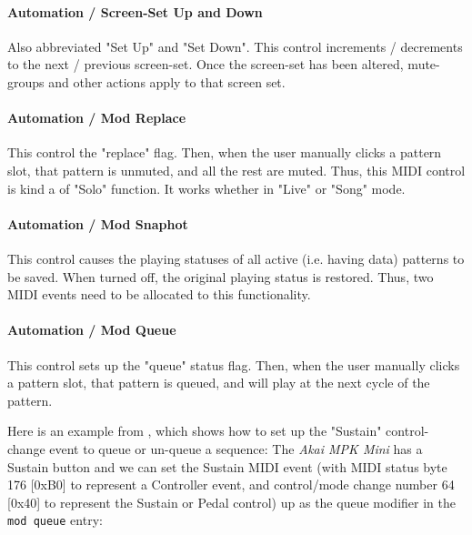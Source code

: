 \paragraph{Automation / Screen-Set Up and Down}
\label{paragraph:configuration_midi_ctrl_ssupdn}

   Also abbreviated "Set Up" and "Set Down".
   This control increments / decrements to the next / previous screen-set. 
   Once the screen-set has been altered, mute-groups and other
   actions apply to that screen set.

\paragraph{Automation / Mod Replace}
\label{paragraph:configuration_midi_ctrl_modrep}

   This control the "replace" flag.
   Then, when the user manually clicks a pattern slot,
   that pattern is unmuted, and all the rest are muted.
   Thus, this MIDI control is kind a of "Solo" function.
   It works whether in "Live" or "Song" mode.

\paragraph{Automation / Mod Snaphot}
\label{paragraph:configuration_midi_ctrl_modsnap}

   This control causes the playing statuses of all active
   (i.e. having data) patterns to be saved.  When turned off, the
   original playing status is restored.  Thus, two MIDI events
   need to be allocated to this functionality.

\paragraph{Automation / Mod Queue}
\label{paragraph:configuration_midi_ctrl_modqueue}

   This control sets up the "queue" status flag.
   Then, when the user manually clicks a pattern slot,
   that pattern is queued, and will play at the next cycle of the
   pattern.

   Here is an example from \cite{midicontrol}, which shows how to set up
   the "Sustain" control-change event to queue or un-queue a sequence:
   The \textsl{Akai MPK Mini} has a Sustain button and we can set the
   Sustain MIDI event (with MIDI status byte 176 [0xB0] to represent a
   Controller event, and control/mode change number 64 [0x40] to
   represent the Sustain or Pedal control) up as the queue modifier in
   the \texttt{mod queue} entry:

